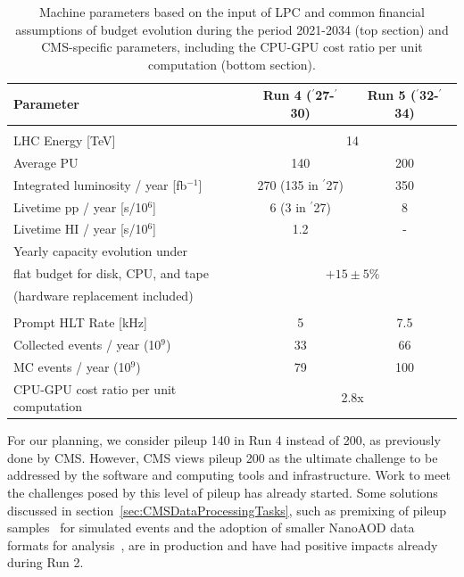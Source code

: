 \documentclass{cmspaper}
\newcommand{\trh}{\cellcolor{tablerowheader}}
\newcommand{\B}[1]{\textbf{#1}}
\begin{document}
\begin{table}[ht]
\begin{center}
\caption{Machine parameters based on the input of LPC and common financial assumptions of budget evolution during the period 2021-2034 (top section) and CMS-specific parameters, including the CPU-GPU cost ratio per unit computation (bottom section).}
\label{tab:scenarios}
\begin{tabular}{lcc} 
\hline
\rowcolor{tableheader} \B{Parameter} & \B{Run 4 ($^\prime$27-$^\prime$30)} & \B{Run 5 ($^\prime$32-$^\prime$34)} \\
\hline  \hline
\rowcolor{tableheader} \multicolumn{3}{c}{\textit{Common}} \\ \hline
\trh LHC Energy [TeV]                             & \multicolumn{2}{c}{14}  \\
\trh  Average PU                                  & 140 & 200 \\
\trh  Integrated luminosity / year [fb$^{-1}$]    & 270 (135 in $^\prime$27) & 350 \\
\trh  Livetime pp / year [s/10$^6$]               & 6 (3 in $^\prime$27) & 8  \\
\trh  Livetime HI / year [s/10$^6$]               & 1.2 & - \\
  \hline
\trh  Yearly capacity evolution under             &  \multicolumn{2}{c}{\multirow{3}{*}{$+15\pm5\%$}} \\
\trh  flat budget for disk, CPU, and tape         &  &\\
\trh  (hardware replacement included)             &  &\\
  \hline \hline
\rowcolor{tableheader} \multicolumn{3}{c}{\textit{CMS-Specific}} \\ \hline
\trh  Prompt HLT Rate [kHz]                       & 5    & 7.5 \\
\trh  Collected events / year (10$^9$)            & 33   & 66  \\
\trh  MC events / year (10$^9$)                   & 79   & 100 \\
\hline
\trh  CPU-GPU cost ratio per unit computation     & \multicolumn{2}{c}{ 2.8x } \\
\hline
\end{tabular}
\end{center}
\end{table}

For our planning, we consider pileup 140 in Run 4 instead of 200, as previously done by CMS. However, CMS views pileup 200 as the ultimate challenge to be addressed by the software and computing tools and infrastructure. Work to meet the challenges posed by this level of pileup has already started. Some solutions discussed in section~\ref{sec:CMSDataProcessingTasks}, such as premixing of pileup samples~\cite{Lange:2015sba} for simulated events and the adoption of smaller NanoAOD data formats for analysis~\cite{Rizzi:2019rsi}, are in production and have had positive impacts already during Run 2.
\end{document}
